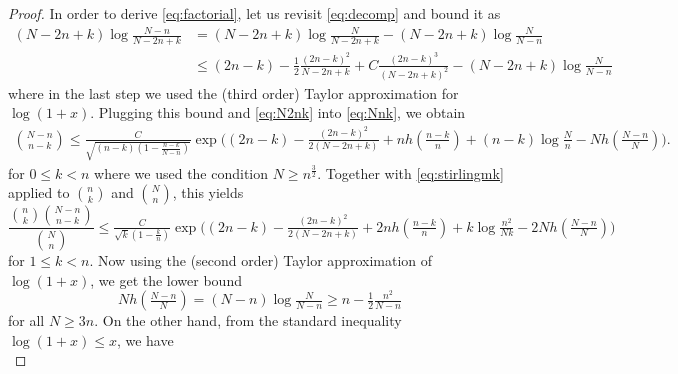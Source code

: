 \documentclass[11pt,reqno,letterpaper]{amsart}
\numberwithin{equation}{section}
\theoremstyle{plain}
\begin{document}
\begin{proof}
In order to derive \eqref{eq:factorial}, let us revisit \eqref{eq:decomp} and 
bound it as
\begin{equation*}
\begin{split}
(N - 2n + k)\log \tfrac {N - n}{N - 2n + k} &= (N - 2n + k) \log \tfrac{N}{N - 2n + k} - (N - 2n + k)\log \tfrac{N}{N - n}\\
&\le (2n - k) - \tfrac12\tfrac{(2n - k)^2}{N - 2n + k}  %
+ C \tfrac{(2n - k)^3}{(N - 2n + k)^2}  - (N - 2n + k)\log \tfrac{N}{N - n}
\end{split}    
\end{equation*}
where in the last step we used the %
(third order) Taylor approximation for $\log (1 + x)$. Plugging this bound and 
\eqref{eq:N2nk} into %
\eqref{eq:Nnk}, we obtain
\begin{equation*}
\begin{split}
\binom{N - n}{n-k}
\le \tfrac{C}{\sqrt{(n - k)(1 - \frac{n - k}{N - n})}} \exp\big((2n - k) - 
\tfrac{(2n - k)^2}{2(N - 2n + k)} + nh(\tfrac{n-k}{n}) + (n-k) \log \tfrac N n - 
N h(\tfrac{N-n}N)\big).
\end{split}
\end{equation*}
for $0 \le k < n$ where we used the condition $N \ge n^{\frac32}$. Together with 
\eqref{eq:stirlingmk} applied to $\binom{n}{k}$ and $\binom{N}{n}$, this yields
\begin{equation}\label{eq:factorial0}
\frac{\binom{n}{k}\binom{N - n}{n - k}}{\binom{N}{n}} \le \tfrac{C}{\sqrt{k}(1 - \frac k n)}\exp\big((2n - k) - \tfrac{(2n - k)^2}{2(N - 2n + k)} + 2nh(\tfrac{n-k}{n}) + %
k \log \tfrac{n^2}{Nk} - 2 N h(\tfrac{N-n}N) \big)
\end{equation}
for %
$1 \le k < n$. Now using the (second order) Taylor approximation of $\log (1 + x)$, we get the lower bound
\begin{equation*}
N h(\tfrac{N-n}N) = (N - n)\log \tfrac N{N-n} \ge n - \tfrac12 \tfrac{n^2}{N - n}
\end{equation*}
for all $N \ge 3n$. On the other hand, from the standard inequality $\log (1 + x) \le x$, we have
\begin{equation*}

\end{equation*}
\end{proof}
\end{document}
